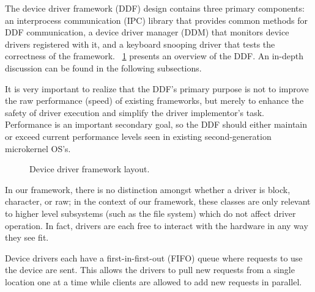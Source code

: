 \label{sec:design}

The {\important device driver framework} (DDF) design contains
three primary components: an interprocess communication (IPC)
library that provides common methods for DDF communication, a
{\important device driver manager} (DDM) that monitors device drivers
registered with it, and a keyboard snooping driver that tests the correctness
of the framework.  \figurename~\ref{fig:ddf_layout} presents an overview of
the DDF. An in-depth discussion can be found in  the following subsections.

It is very important to realize that the DDF's primary purpose is not
to improve the raw performance (speed) of existing frameworks, but
merely to enhance the safety of driver execution and simplify the
driver implementor's task.  Performance is an important secondary
goal, so the DDF should either maintain or exceed current performance
levels seen in existing second-generation microkernel OS's.

	\begin{figure}[tbp]
	\begin{center}
	\end{center}
	\caption{Device driver framework layout.}
	\label{fig:ddf_layout}
	\end{figure}


In our framework, there is no distinction amongst whether a driver is block, character, or raw;
in the context of our framework, these classes are only relevant to higher level
subsystems (such as the file system) which do not affect driver operation.
In fact, drivers are each free to interact with the hardware in any way
they see fit.


Device drivers each have a first-in-first-out (FIFO) queue where requests to
use the device are sent.  This allows the drivers to pull new requests from
a single location one at a time while clients are allowed to add new
requests in parallel.


